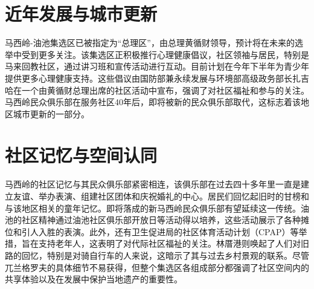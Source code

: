 \documentclass[11pt,a4paper,twoside,openany]{book}
\begin{document}
\section{近年发展与城市更新}
马西岭-油池集选区已被指定为“总理区”，由总理黄循财领导，预计将在未来的选举中受到更多关注。该集选区正积极推行心理健康倡议，社区领袖与居民，特别是马来回教社区，通过讲习班和宣传活动进行互动。目前计划在今年下半年为青少年提供更多心理健康支持。这些倡议由国防部兼永续发展与环境部高级政务部长扎吉哈在一个由黄循财总理出席的社区活动中宣布，强调了对社区福祉和参与的关注。马西岭民众俱乐部在服务社区40年后，即将被新的民众俱乐部取代，这标志着该地区城市更新的一部分。

\section{社区记忆与空间认同}
马西岭的社区记忆与其民众俱乐部紧密相连，该俱乐部在过去四十多年里一直是建立友谊、举办表演、组建社区团体和庆祝婚礼的中心。居民们回忆起旧时的甘榜和与该地区相关的童年记忆。即将落成的新马西岭民众俱乐部有望延续这一传统。油池的社区精神通过油池社区俱乐部开放日等活动得以培养，这些活动展示了各种摊位和引人入胜的表演。此外，还有卫生促进局的社区体育活动计划（CPAP）等举措，旨在支持老年人，这表明了对代际社区福祉的关注。林厝港则唤起了人们对旧路的回忆，特别是对骑自行车的人来说，这暗示了其与过去乡村景观的联系。尽管兀兰格罗夫的具体细节不易获得，但整个集选区各组成部分都强调了社区空间内的共享体验以及在发展中保护当地遗产的重要性。
\end{document}
